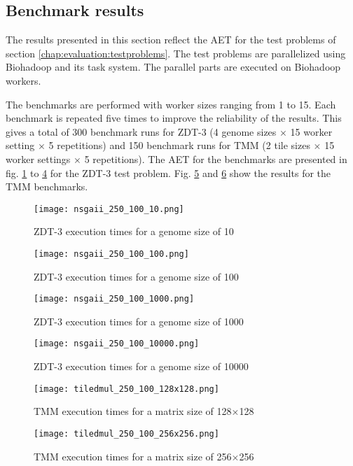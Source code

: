 \subsection{Benchmark results}
The results presented in this section reflect the AET for the test problems of section \ref{chap:evaluation:testproblems}. The test problems are parallelized using Biohadoop and its task system. The parallel parts are executed on Biohadoop workers.

The benchmarks are performed with worker sizes ranging from 1 to 15. Each benchmark is repeated five times to improve the reliability of the results. This gives a total of 300 benchmark runs for ZDT-3 (4 genome sizes $\times$ 15 worker setting $\times$ 5 repetitions) and 150 benchmark runs for TMM (2 tile sizes $\times$ 15 worker settings $\times$ 5 repetitions). The AET for the benchmarks are presented in fig. \ref{fig:nsga_250_100_10} to \ref{fig:nsga_250_100_10000} for the ZDT-3 test problem. Fig. \ref{fig:tiledmul_250_100_128x128} and \ref{fig:tiledmul_250_100_256x256} show the results for the TMM benchmarks.

\begin{figure}
  \centering
  \texttt{[image: nsgaii\_250\_100\_10.png]}
  \caption[ZDT-3 execution times for a genome size of 10]{ZDT-3 execution times for a genome size of 10}
  \label{fig:nsga_250_100_10}
\end{figure}
\begin{figure}
  \centering
  \texttt{[image: nsgaii\_250\_100\_100.png]}
  \caption[ZDT-3 execution times for a genome size of 100]{ZDT-3 execution times for a genome size of 100}
  \label{fig:nsga_250_100_100}
\end{figure}
\begin{figure}
  \centering
  \texttt{[image: nsgaii\_250\_100\_1000.png]}
  \caption[ZDT-3 execution times for a genome size of 1000]{ZDT-3 execution times for a genome size of 1000}
  \label{fig:nsga_250_100_1000}
\end{figure}
\begin{figure}
  \centering
  \texttt{[image: nsgaii\_250\_100\_10000.png]}
  \caption[ZDT-3 execution times for a genome size of 10000]{ZDT-3 execution times for a genome size of 10000}
  \label{fig:nsga_250_100_10000}
\end{figure}

\begin{figure}
  \centering
  \texttt{[image: tiledmul\_250\_100\_128x128.png]}
  \caption[TMM execution times for a matrix size of 128$\times$128]{TMM execution times for a matrix size of 128$\times$128}
  \label{fig:tiledmul_250_100_128x128}
\end{figure}
\begin{figure}
  \centering
  \texttt{[image: tiledmul\_250\_100\_256x256.png]}
  \caption[TMM execution times for a matrix size of 256$\times$256]{TMM execution times for a matrix size of 256$\times$256}
  \label{fig:tiledmul_250_100_256x256}
\end{figure}

